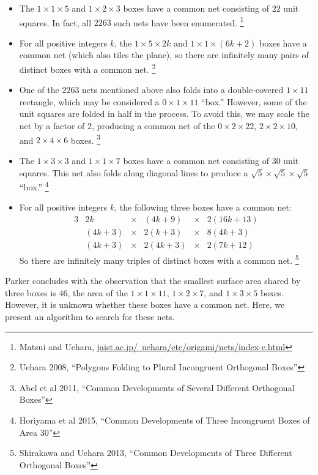 \documentclass{article}
\begin{document}
\begin{itemize}
\item
  The $1 \times 1 \times 5$ and $1 \times 2 \times 3$ boxes
  have a common net consisting of $22$ unit squares.
  In fact, all $2263$ such nets have been enumerated.
  \footnote{
  Matsui and Uehara, \href{
    https://www.jaist.ac.jp/~uehara/etc/origami/nets/index-e.html}{
    jaist.ac.jp/~uehara/etc/origami/nets/index-e.html}}
\item
  For all positive integers $k$,
  the $1 \times 5 \times 2k$ and $1 \times 1 \times (6k+2)$ boxes
  have a common net (which also tiles the plane),
  so there are infinitely many pairs of distinct boxes with a common net.
  \footnote{
  Uehara 2008, ``Polygons Folding to Plural Incongruent Orthogonal Boxes''
  }
\item
  One of the $2263$ nets mentioned above
  also folds into a double-covered $1 \times 11$ rectangle,
  which may be considered a $0 \times 1 \times 11$ ``box.''
  However, some of the unit squares are folded in half in the process.
  To avoid this, we may scale the net by a factor of $2$,
  producing a common net of the $0 \times 2 \times 22$,
  $2 \times 2 \times 10$, and $2 \times 4 \times 6$ boxes.
  \footnote
      {Abel et al 2011,
        ``Common Developments of Several Different Orthogonal Boxes''
      }
    \item
      The $1 \times 3 \times 3$ and $1 \times 1 \times 7$ boxes
      have a common net consisting of $30$ unit squares.
      This net also folds along diagonal lines
      to produce a $\sqrt{5} \times \sqrt{5} \times \sqrt{5}$ ``box.''
      \footnote{
      Horiyama et al 2015,
      ``Common Developments of Three Incongruent Boxes of Area 30''
      }
    \item
      For all positive integers $k$,
      the following three boxes have a common net:
      \begin{alignat*}{3}
        &2k &\times& (4k+9) &\times& 2(16k+13) \\
        &(4k+3) &\times& 2(k+3) &\times& 8(4k+3) \\
        &(4k+3) &\times& 2(4k+3) &\times& 2(7k+12)
      \end{alignat*}
      So there are infinitely many triples of distinct boxes with a common net.
      \footnote{
      Shirakawa and Uehara 2013,
      ``Common Developments of Three Different Orthogonal Boxes''
      }
\end{itemize}
Parker concludes with the observation that
the smallest surface area shared by three boxes is $46$,
the area of the $1 \times 1 \times 11$, $1 \times 2 \times 7$,
and $1 \times 3 \times 5$ boxes.
However, it is unknown whether these boxes have a common net.
Here, we present an algorithm to search for these nets.
\end{document}
